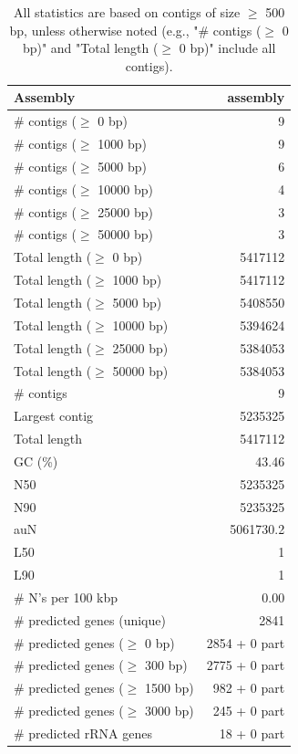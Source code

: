 \documentclass[12pt,a4paper]{article}
\begin{document}
\begin{table}[ht]
\begin{center}
\caption{All statistics are based on contigs of size $\geq$ 500 bp, unless otherwise noted (e.g., "\# contigs ($\geq$ 0 bp)" and "Total length ($\geq$ 0 bp)" include all contigs).}
\begin{tabular}{|l*{1}{|r}|}
\hline
Assembly & assembly \\ \hline
\# contigs ($\geq$ 0 bp) & 9 \\ \hline
\# contigs ($\geq$ 1000 bp) & 9 \\ \hline
\# contigs ($\geq$ 5000 bp) & 6 \\ \hline
\# contigs ($\geq$ 10000 bp) & 4 \\ \hline
\# contigs ($\geq$ 25000 bp) & 3 \\ \hline
\# contigs ($\geq$ 50000 bp) & 3 \\ \hline
Total length ($\geq$ 0 bp) & 5417112 \\ \hline
Total length ($\geq$ 1000 bp) & 5417112 \\ \hline
Total length ($\geq$ 5000 bp) & 5408550 \\ \hline
Total length ($\geq$ 10000 bp) & 5394624 \\ \hline
Total length ($\geq$ 25000 bp) & 5384053 \\ \hline
Total length ($\geq$ 50000 bp) & 5384053 \\ \hline
\# contigs & 9 \\ \hline
Largest contig & 5235325 \\ \hline
Total length & 5417112 \\ \hline
GC (\%) & 43.46 \\ \hline
N50 & 5235325 \\ \hline
N90 & 5235325 \\ \hline
auN & 5061730.2 \\ \hline
L50 & 1 \\ \hline
L90 & 1 \\ \hline
\# N's per 100 kbp & 0.00 \\ \hline
\# predicted genes (unique) & 2841 \\ \hline
\# predicted genes ($\geq$ 0 bp) & 2854 + 0 part \\ \hline
\# predicted genes ($\geq$ 300 bp) & 2775 + 0 part \\ \hline
\# predicted genes ($\geq$ 1500 bp) & 982 + 0 part \\ \hline
\# predicted genes ($\geq$ 3000 bp) & 245 + 0 part \\ \hline
\# predicted rRNA genes & 18 + 0 part \\ \hline
\end{tabular}
\end{center}
\end{table}
\end{document}
